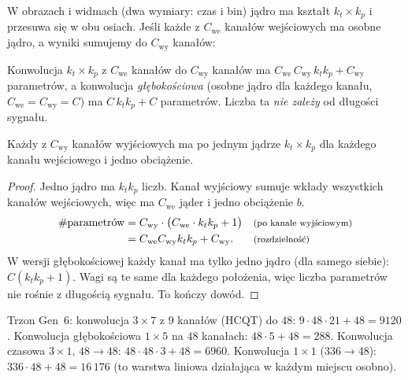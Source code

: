 W obrazach i widmach (dwa wymiary: czas i bin) jądro ma kształt $k_t\times k_p$ i przesuwa się w obu osiach. Jeśli każde z $C_\mathrm{we}$ kanałów wejściowych ma osobne jądro, a wyniki sumujemy do $C_\mathrm{wy}$ kanałów:

\begin{twierdzenie}\label{tw:param-konw}
Konwolucja $k_t\times k_p$ z $C_\mathrm{we}$ kanałów do $C_\mathrm{wy}$ kanałów ma $C_\mathrm{we}\,C_\mathrm{wy}\,k_tk_p+C_\mathrm{wy}$ parametrów, a konwolucja \emph{głębokościowa} (osobne jądro dla każdego kanału, $C_\mathrm{we}=C_\mathrm{wy}=C$)
ma $C\,k_tk_p+C$ parametrów. Liczba ta \emph{nie zależy} od długości sygnału.
\end{twierdzenie}
\begin{pomyslDowodu}
Każdy z $C_\mathrm{wy}$ kanałów wyjściowych ma po jednym jądrze $k_t\times k_p$ dla każdego kanału wejściowego i jedno obciążenie.
\end{pomyslDowodu}
\begin{proof}
Jedno jądro ma $k_tk_p$ liczb. Kanał wyjściowy sumuje wkłady wszystkich kanałów wejściowych, więc ma $C_\mathrm{we}$ jąder i jedno obciążenie $b$.
\begin{align*}
\#\text{parametrów} &= C_\mathrm{wy}\cdot\big(C_\mathrm{we}\cdot k_tk_p+1\big) && \text{\footnotesize (po kanale wyjściowym)}\\
 &= C_\mathrm{we}C_\mathrm{wy}k_tk_p+C_\mathrm{wy}. && \text{\footnotesize (rozdzielność)}
\end{align*}
W wersji głębokościowej każdy kanał ma tylko jedno jądro (dla samego siebie): $C(k_tk_p+1)$. Wagi są te same dla każdego położenia, więc liczba parametrów nie rośnie z długością sygnału. To kończy dowód.
\end{proof}

\begin{naliczbach}
Trzon Gen~6: konwolucja $3\times7$ z $9$ kanałów (HCQT) do $48$: $9\cdot48\cdot21+48=9120$. Konwolucja głębokościowa $1\times5$ na $48$ kanałach: $48\cdot5+48=288$.
Konwolucja czasowa $3\times1$, $48\to48$: $48\cdot48\cdot3+48=6960$. Konwolucja $1\times1$ ($336\to48$): $336\cdot48+48=16\,176$ (to warstwa liniowa działająca w każdym miejscu osobno).
\end{naliczbach}

